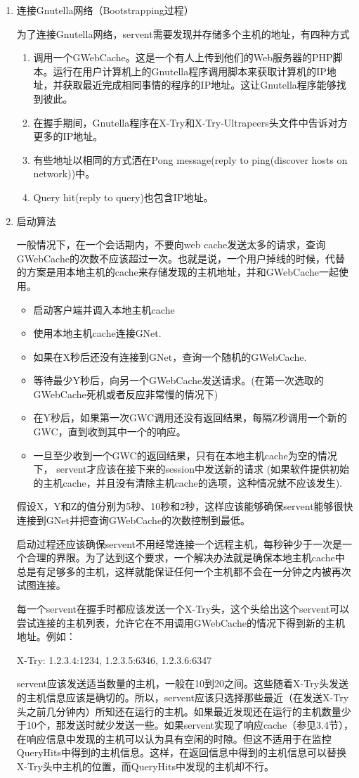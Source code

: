 \documentclass{ctexart}
\begin{document}
\begin{enumerate}
	\item 连接Gnutella网络（Bootstrapping过程）
	
	为了连接Gnutella网络，servent需要发现并存储多个主机的地址，有四种方式
	\begin{enumerate}
		\item 调用一个GWebCache。这是一个有人上传到他们的Web服务器的PHP脚本。运行在用户计算机上的Gnutella程序调用脚本来获取计算机的IP地址，并获取最近完成相同事情的程序的IP地址。这让Gnutella程序能够找到彼此。
		\item 在握手期间，Gnutella程序在X-Try和X-Try-Ultrapeers头文件中告诉对方更多的IP地址。
		\item 有些地址以相同的方式洒在Pong message(reply to ping(discover hosts on network))中。
		\item Query hit(reply to query)也包含IP地址。
	\end{enumerate}
	\item 启动算法
	
	一般情况下，在一个会话期内，不要向web cache发送太多的请求，查询GWebCache的次数不应该超过一次。也就是说，一个用户掉线的时候，代替的方案是用本地主机的cache来存储发现的主机地址，并和GWebCache一起使用。
	\begin{itemize}
		\item 启动客户端并调入本地主机cache
		\item 使用本地主机cache连接GNet.
		\item 如果在X秒后还没有连接到GNet，查询一个随机的GWebCache.
		\item 等待最少Y秒后，向另一个GWebCache发送请求。(在第一次选取的GWebCache死机或者反应非常慢的情况下)
		\item 在Y秒后，如果第一次GWC调用还没有返回结果，每隔Z秒调用一个新的GWC，直到收到其中一个的响应。
		\item 一旦至少收到一个GWC的返回结果，只有在本地主机cache为空的情况下，           servent才应该在接下来的session中发送新的请求 (如果软件提供初始的主机cache，并且没有清除主机cache的选项，这种情况就不应该发生).
	\end{itemize}
	假设X，Y和Z的值分别为5秒、10秒和2秒，这样应该能够确保servent能够很快连接到GNet并把查询GWebCache的次数控制到最低。
	
	启动过程还应该确保servent不用经常连接一个远程主机，每秒钟少于一次是一个合理的界限。为了达到这个要求，一个解决办法就是确保本地主机cache中总是有足够多的主机，这样就能保证任何一个主机都不会在一分钟之内被再次试图连接。
	
	每一个servent在握手时都应该发送一个X-Try头，这个头给出这个servent可以尝试连接的主机列表，允许它在不用调用GWebCache的情况下得到新的主机地址。例如：
	
	X-Try:  1.2.3.4:1234, 1.2.3.5:6346, 1.2.3.6:6347
	
	servent应该发送适当数量的主机，一般在10到20之间。这些随着X-Try头发送的主机信息应该是确切的。所以，servent应该只选择那些最近（在发送X-Try头之前几分钟内）所知还在运行的主机。如果最近发现还在运行的主机数量少于10个，那发送时就少发送一些。如果servent实现了响应cache（参见3.4节），在响应信息中发现的主机可以认为具有空闲的时隙。但这不适用于在监控QueryHits中得到的主机信息。这样，在返回信息中得到的主机信息可以替换X-Try头中主机的位置，而QueryHits中发现的主机却不行。
\end{enumerate}
\end{document}
